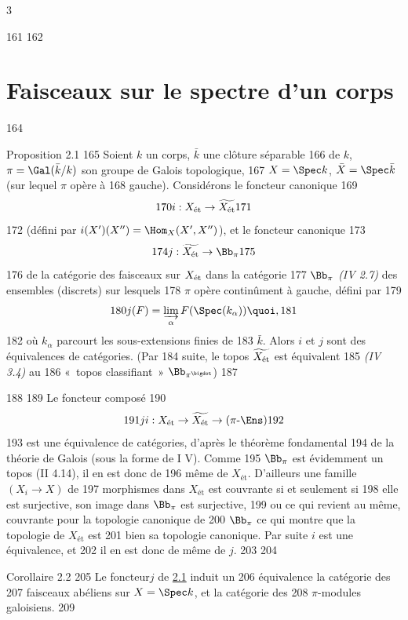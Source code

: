 3	\documentclass[10pt]{../fichiers-configuration-latex/smfart}
\begin{document}
   161	
   162	\section{Faisceaux sur le spectre d'un corps}	
   164	\begin{enonce*}{Proposition 2.1}
   165	Soient $k$ un corps, $\bar{k}$ une clôture séparable
   166	de $k$, $\pi = \Gal (\bar{k}/k)$ son groupe de Galois topologique,
   167	$X = \Spec k$, $\bar{X} = \Spec \bar{k}$ (sur lequel $\pi$ opère à
   168	gauche). Considérons le foncteur canonique
   169	$$
   170	i : X_{\text{\rm ét}} \to \widetilde{X_{\text{\rm ét}}}
   171	$$
   172	(défini par $i(X')(X'') = \Hom_X (X', X'')$), et le foncteur canonique
   173	$$
   174	j : \widetilde{X_{\text{\rm ét}}} \to \Bb_{\pi}
   175	$$
   176	de la catégorie des faisceaux sur $X_{\text{\rm ét}}$ dans la catégorie
   177	$\Bb_{\pi}$ \emph{(\cf IV 2.7)} des ensembles (discrets) sur lesquels
   178	$\pi$ opère continûment à gauche, défini par
   179	$$
   180	j(F) = \varinjlim_{\alpha} F(\Spec(k_{\alpha})){\quoi},
   181	$$
   182	où $k_{\alpha}$ parcourt les sous-extensions finies de
   183	$\bar{k}$. Alors $i$ et $j$ sont des équivalences de catégories. (Par
   184	suite, le topos $\widetilde{X_{\text{\rm ét}}}$ est équivalent
   185	\emph{(IV 3.4)} au
   186	« topos classifiant » $\Bb_{\pi^{\bigdot}}$)
   187	\end{enonce*}
   188	
   189	Le foncteur composé
   190	$$
   191	ji : X_{\text{\rm ét}} \to \widetilde{X_{\text{ét}}} \to (\pi\text{-}\Ens)
   192	$$
   193	est une équivalence de catégories, d'après le théorème fondamental
   194	de la théorie de Galois (sous la forme de \SGA I V). Comme
   195	$\Bb_{\pi}$ est évidemment un topos (II 4.14), il en est donc de
   196	même de $X_{\text{ét}}$. D'ailleurs une famille $(X_i \to X)$ de
   197	morphismes dans $X_{\text{ét}}$ est couvrante si et seulement si
   198	elle est surjective, \ie son image dans $\Bb_{\pi}$ est surjective,
   199	ou ce qui revient au même, couvrante pour la topologie canonique de
   200	$\Bb_{\pi}$ ce qui montre que la topologie de $X_{\text{ét}}$ est
   201	bien sa topologie canonique. Par suite $i$ est une équivalence, et
   202	il en est donc de même de $j$.
   203	
   204	\begin{enonce*}{Corollaire 2.2}
   205	Le foncteur\pageoriginale  $j$ de \hyperref[VIII.prop2.1]{2.1} induit un
   206	équivalence  la catégorie des
   207	faisceaux abéliens sur $X = \Spec k$, et la catégorie des
   208	$\pi$-modules galoisiens.
   209	\end{enonce*}
\end{document}
